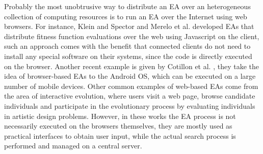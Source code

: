 Probably the most unobtrusive way to distribute an EA over an heterogeneous collection of computing resources is to run an EA over the Internet using web browsers.
For instance, Klein and Spector \cite{spector:2007} and Merelo et al. \cite{merelo:2008} developed EAs that distribute fitness function evaluations over the web
using Javascript on the client, such an approach comes with the benefit that connected clients do not need to install any special software on their systems,
since the code is directly executed on the browser.
Another recent example is given by Cotillon et al. \cite{cotillon:2012}, they take the idea of browser-based EAs to the Android OS, which can be
executed on a large number of mobile devices.
Other common examples of web-based EAs come from the area of interactive evolution, where users visit a web page, browse candidate individuals
and participate in the evolutionary process by evaluating individuals in artistic design problems\cite{langdon:2004,picbreeder,Musart,Fire}.
However, in these works the EA process is not necessarily executed on the browsers themselves, they are mostly used as practical interfaces to obtain
user input, while the actual search process is performed and managed on a central server.


